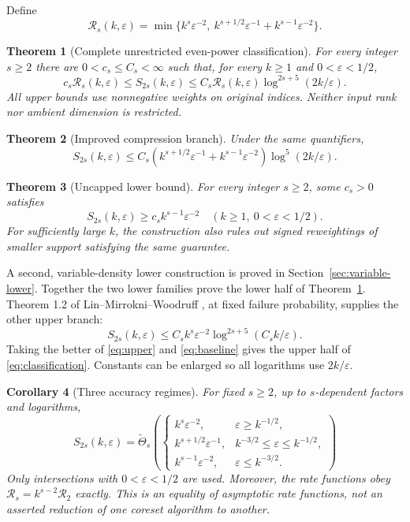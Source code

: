 \documentclass[11pt]{article}
\newtheorem{theorem}{Theorem}[section]
\newtheorem{corollary}[theorem]{Corollary}
\theoremstyle{remark}\newtheorem{remark}[theorem]{Remark}
\newcommand{\eps}{\varepsilon}\newcommand{\Sym}{\operatorname{Sym}}
\begin{document}
Define
\begin{equation}\label{eq:rate}
 \mathcal R_s(k,\eps)=\min\{k^s\eps^{-2},\ k^{s+1/2}\eps^{-1}+k^{s-1}\eps^{-2}\}.
\end{equation}
\begin{theorem}[Complete unrestricted even-power classification]\label{thm:classification}
For every integer $s\ge2$ there are $0<c_s\le C_s<\infty$ such that, for every $k\ge1$ and $0<\eps<1/2$,
\begin{equation}\label{eq:classification}
 c_s\mathcal R_s(k,\eps)\le S_{2s}(k,\eps)
 \le C_s\mathcal R_s(k,\eps)\log^{2s+5}(2k/\eps).
\end{equation}
All upper bounds use nonnegative weights on original indices. Neither input rank nor ambient dimension is restricted.
\end{theorem}
\begin{theorem}[Improved compression branch]\label{thm:upper}
Under the same quantifiers,
\begin{equation}\label{eq:upper}
 S_{2s}(k,\eps)\le C_s\left(k^{s+1/2}\eps^{-1}+k^{s-1}\eps^{-2}\right)\log^5(2k/\eps).
\end{equation}
\end{theorem}
\begin{theorem}[Uncapped lower bound]\label{thm:lower}
For every integer $s\ge2$, some $c_s>0$ satisfies
\begin{equation}\label{eq:lower}
 S_{2s}(k,\eps)\ge c_s k^{s-1}\eps^{-2}
 \quad(k\ge1,\ 0<\eps<1/2).
\end{equation}
For sufficiently large $k$, the construction also rules out signed reweightings of smaller support satisfying the same guarantee.
\end{theorem}
A second, variable-density lower construction is proved in Section~\ref{sec:variable-lower}. Together the two lower families prove the lower half of Theorem~\ref{thm:classification}.
Theorem 1.2 of Lin--Mirrokni--Woodruff \cite{lmw}, at fixed failure probability, supplies the other upper branch:
\begin{equation}\label{eq:baseline}
 S_{2s}(k,\eps)\le C_s k^s\eps^{-2}\log^{2s+5}(C_s k/\eps).
\end{equation}
Taking the better of \eqref{eq:upper} and \eqref{eq:baseline} gives the upper half of \eqref{eq:classification}. Constants can be enlarged so all logarithms use $2k/\eps$.

\begin{corollary}[Three accuracy regimes]\label{cor:regimes}
For fixed $s\ge2$, up to $s$-dependent factors and logarithms,
\[
 S_{2s}(k,\eps)=\widetilde\Theta_s\!\left(
 \begin{cases}
 k^s\eps^{-2},&\eps\ge k^{-1/2},\\
 k^{s+1/2}\eps^{-1},&k^{-3/2}\le\eps\le k^{-1/2},\\
 k^{s-1}\eps^{-2},&\eps\le k^{-3/2}.
 \end{cases}\right)
\]
Only intersections with $0<\eps<1/2$ are used. Moreover, the rate functions obey $\mathcal R_s=k^{s-2}\mathcal R_2$ exactly. This is an equality of asymptotic rate functions, not an asserted reduction of one coreset algorithm to another.
\end{corollary}
\end{document}
